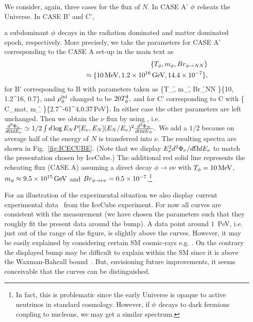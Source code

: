 \documentclass[superscriptaddress,aps,preprintnumbers,amsmath,showpacs,amssymb,prd,nofootinbib,reprint]{revtex4-1}
\begin{document}
{We consider, again, three cases for the flux of $N$. 
In CASE A' $\phi$ reheats the Universe. In CASE B' and C', {a subdominant $\phi$ decays in the radiation dominated and matter dominated epoch, respectively. More precisely, we take the parameters for CASE A' corresponding to the CASE A set-up in the main text as 
\begin{eqnarray}
&&\!\!\!\!\{T_\phi, m_\phi, Br_{\phi\to N{N} }\}
\\\nonumber
&&\quad\qquad\qquad\approx \{10{\rm \, MeV}, 1.2\times10^{16}{\rm \, GeV},  14.4 \times 10^{-7}\}, 
\end{eqnarray}
for B' corresponding to B with parameters taken as
\beq
\{T_\f, m_\f, Br_{\f\to N{N} }\}\approx \{10\MEV, 1.2^{16}\GEV,  0.7\},
\eeq
and $\rho_\phi^{\rm ini}$ changed to be $20 T_\phi^4,$ 
and for C' corresponding to C with 
\beq
\{ C_{\rm mat}, m_{\f } \}\approx \{2.7^{-61}\GEV^4,0.37\,{\rm PeV}\}. 
\eeq
In either case the other parameters are left unchanged.
Then we obtain the $\nu$ flux by using , i.e. 
$ \frac{d^2 \Phi_\nu}{d \Omega d E_\nu }\simeq 1/2 \int{d \log {E_N} P[E_\nu, E_N] (E_N/E_\nu)^2 \frac{d^2 \Phi_N}{d \Omega  d E_N}}.$ We add a $1/2$ because on average half of the energy of $N$ is transferred into $\nu$. 
The resulting spectra are shown in Fig.~\ref{fig:ICECUBE}. (Note that we {display $E^2_{\nu} d^2 \Phi_\nu/d\Omega dE_{\nu}$} to match the presentation chosen by IceCube.)
The additional red solid line represents the reheating flux (CASE A) assuming a direct decay $\phi \to \nu \nu$ with $T_\phi=10{\rm \, MeV}$, $m_\phi\approx 9.5\times 10^{15}{\rm \, GeV}$ and $Br_{\phi\to \nu\nu}=0.5\times 10^{-7}$.\footnote{\label{foot1}In fact, this is problematic since the early Universe is opaque to active neutrinos in standard cosmology. However, if $\phi$ decays to dark fermions coupling to nucleons, we may get a similar spectrum. }

For an illustration of the experimental situation we also display current experimental data~\cite{Abbasi:2020jmh} from the IceCube experiment. For now all curves are consistent with the measurement (we have chosen the parameters such that they roughly fit the present data around the bump). A data point around $1$~PeV, i.e. just out of the range of the figure, is slightly above the curves. However, it may be easily explained by considering certain SM cosmic-rays e.g. \cite{Abbasi:2020jmh}. On the contrary the displayed bump may be difficult to explain within the SM since it is above the Waxman-Bahcall bound~\cite{Waxman:1998yy}. But, envisioning future improvements, it seems conceivable that the curves can be distinguished. 

}}
\end{document}
